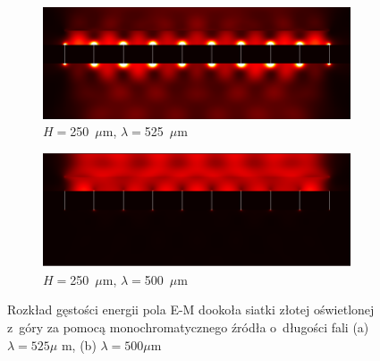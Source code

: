 \begin{figure}[bth]
	\begin{subfigure}{0.45\textwidth}
		\includegraphics[width=\textwidth]{images/thz/con_src_l525.png}
		\caption{$H=$250~$\mu$m, $\lambda=$525~$\mu$m}
		\label{fig:consrcl525}
	\end{subfigure}
	\begin{subfigure}{0.45\textwidth}
		\includegraphics[width=\textwidth]{images/thz/con_src_l500.png}
		\caption{$H=$250~$\mu$m, $\lambda=$500~$\mu$m}
		\label{fig:consrcl500}
	\end{subfigure}
	\caption{Rozkład gęstości energii pola E-M dookoła siatki złotej oświetlonej z~góry za pomocą monochromatycznego źródła o~długości fali (a) $\lambda=525\mu$ m, (b) $\lambda=500\mu$m} 
\end{figure}

